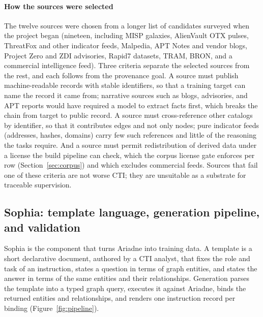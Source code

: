 \documentclass[twocolumn]{svjour3}
\begin{document}
\paragraph{How the sources were selected}
The twelve sources were chosen from a longer list of candidates surveyed when the project began (nineteen, including MISP galaxies, AlienVault OTX pulses, ThreatFox and other indicator feeds, Malpedia, APT Notes and vendor blogs, Project Zero and ZDI advisories, Rapid7 datasets, TRAM, BRON, and a commercial intelligence feed). Three criteria separate the selected sources from the rest, and each follows from the provenance goal. A source must publish machine-readable records with stable identifiers, so that a training target can name the record it came from; narrative sources such as blogs, advisories, and APT reports would have required a model to extract facts first, which breaks the chain from target to public record. A source must cross-reference other catalogs by identifier, so that it contributes edges and not only nodes; pure indicator feeds (addresses, hashes, domains) carry few such references and little of the reasoning the tasks require. And a source must permit redistribution of derived data under a license the build pipeline can check, which the corpus license gate enforces per row (Section~\ref{sec:corpus}) and which excludes commercial feeds. Sources that fail one of these criteria are not worse CTI; they are unsuitable as a substrate for traceable supervision.

\subsection{Sophia: template language, generation pipeline, and validation}\label{sec:sophia}
Sophia is the component that turns Ariadne into training data. A template is a short declarative document, authored by a CTI analyst, that fixes the role and task of an instruction, states a question in terms of graph entities, and states the answer in terms of the same entities and their relationships. Generation parses the template into a typed graph query, executes it against Ariadne, binds the returned entities and relationships, and renders one instruction record per binding (Figure~\ref{fig:pipeline}).
\end{document}
